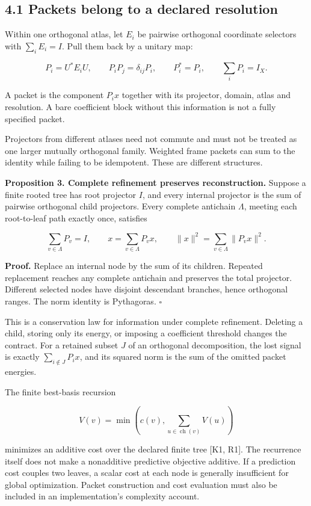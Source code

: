 \documentclass[11pt,letterpaper]{article}
\begin{document}
\subsection{4.1 Packets belong to a declared
resolution}\label{packets-belong-to-a-declared-resolution}

Within one orthogonal atlas, let \(E_i\) be pairwise orthogonal
coordinate selectors with \(\sum_iE_i=I\). Pull them back by a unitary
map:

\[
P_i=U^*E_iU,\qquad P_iP_j=\delta_{ij}P_i,
\qquad P_i^*=P_i,\qquad\sum_iP_i=I_X.
\]

A packet is the component \(P_ix\) together with its projector, domain,
atlas and resolution. A bare coefficient block without this information
is not a fully specified packet.

Projectors from different atlases need not commute and must not be
treated as one larger mutually orthogonal family. Weighted frame packets
can sum to the identity while failing to be idempotent. These are
different structures.

\textbf{Proposition 3. Complete refinement preserves reconstruction.}
Suppose a finite rooted tree has root projector \(I\), and every
internal projector is the sum of pairwise orthogonal child projectors.
Every complete antichain \(\Lambda\), meeting each root-to-leaf path
exactly once, satisfies

\[
\sum_{v\in\Lambda}P_v=I,\qquad
x=\sum_{v\in\Lambda}P_vx,\qquad
\|x\|^2=\sum_{v\in\Lambda}\|P_vx\|^2.
\]

\textbf{Proof.} Replace an internal node by the sum of its children.
Repeated replacement reaches any complete antichain and preserves the
total projector. Different selected nodes have disjoint descendant
branches, hence orthogonal ranges. The norm identity is Pythagoras.
\(\square\)

This is a conservation law for information under complete refinement.
Deleting a child, storing only its energy, or imposing a coefficient
threshold changes the contract. For a retained subset \(J\) of an
orthogonal decomposition, the lost signal is exactly
\(\sum_{i\notin J}P_ix\), and its squared norm is the sum of the omitted
packet energies.

The finite best-basis recursion

\[
V(v)=\min\left(c(v),\sum_{u\in\operatorname{ch}(v)}V(u)\right)
\]

minimizes an additive cost over the declared finite tree {[}K1, R1{]}.
The recurrence itself does not make a nonadditive predictive objective
additive. If a prediction cost couples two leaves, a scalar cost at each
node is generally insufficient for global optimization. Packet
construction and cost evaluation must also be included in an
implementation's complexity account.
\end{document}
